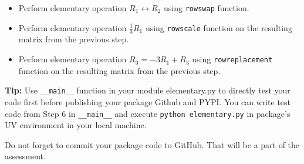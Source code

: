 \documentclass[12pt, xcolor=dvipsnames,svgnames,x11names]{article}
\begin{document}
\begin{enumerate}
   \begin{itemize}
      \item Perform elementary operation $R_1 \leftrightarrow  R_2$  using \texttt{rowswap} function.
      \item Perform elementary operation $\frac{1}{3}R_1$  using \texttt{rowscale} function on the resulting matrix from the previous step.
      \item Perform elementary operation $R_3 = -3R_1 + R_3$  using \texttt{rowreplacement} function on the resulting matrix from the previous step.
   \end{itemize}
\end{enumerate}

\textbf{Tip:} Use \texttt{\_\_main\_\_} function in your module {elementary.py} to directly test your code first before publishing your package Github and PYPI. You can write test code from Step 6 in \texttt{\_\_main\_\_} and execute \texttt{python elementary.py} in package's UV environment in your local machine.

Do not forget to commit your package code to GitHub. That will be a part of the assessment.
\end{document}
